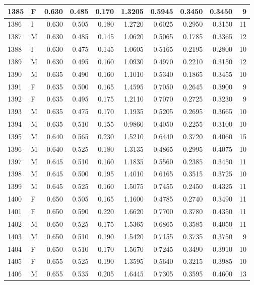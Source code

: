 \documentclass[9pt,twocolumn,twoside,]{pnas-new}
\begin{document}
\begin{tabular}{l|l|r|r|r|r|r|r|r|r}
\hline
1385 & F & 0.630 & 0.485 & 0.170 & 1.3205 & 0.5945 & 0.3450 & 0.3450 & 9\\
\hline
1386 & I & 0.630 & 0.505 & 0.180 & 1.2720 & 0.6025 & 0.2950 & 0.3150 & 11\\
\hline
1387 & M & 0.630 & 0.485 & 0.145 & 1.0620 & 0.5065 & 0.1785 & 0.3365 & 12\\
\hline
1388 & I & 0.630 & 0.475 & 0.145 & 1.0605 & 0.5165 & 0.2195 & 0.2800 & 10\\
\hline
1389 & M & 0.630 & 0.495 & 0.160 & 1.0930 & 0.4970 & 0.2210 & 0.3150 & 12\\
\hline
1390 & M & 0.635 & 0.490 & 0.160 & 1.1010 & 0.5340 & 0.1865 & 0.3455 & 10\\
\hline
1391 & F & 0.635 & 0.500 & 0.165 & 1.4595 & 0.7050 & 0.2645 & 0.3900 & 9\\
\hline
1392 & F & 0.635 & 0.495 & 0.175 & 1.2110 & 0.7070 & 0.2725 & 0.3230 & 9\\
\hline
1393 & M & 0.635 & 0.475 & 0.170 & 1.1935 & 0.5205 & 0.2695 & 0.3665 & 10\\
\hline
1394 & M & 0.635 & 0.510 & 0.155 & 0.9860 & 0.4050 & 0.2255 & 0.3100 & 10\\
\hline
1395 & M & 0.640 & 0.565 & 0.230 & 1.5210 & 0.6440 & 0.3720 & 0.4060 & 15\\
\hline
1396 & M & 0.640 & 0.525 & 0.180 & 1.3135 & 0.4865 & 0.2995 & 0.4075 & 10\\
\hline
1397 & M & 0.645 & 0.510 & 0.160 & 1.1835 & 0.5560 & 0.2385 & 0.3450 & 11\\
\hline
1398 & M & 0.645 & 0.500 & 0.195 & 1.4010 & 0.6165 & 0.3515 & 0.3725 & 10\\
\hline
1399 & M & 0.645 & 0.525 & 0.160 & 1.5075 & 0.7455 & 0.2450 & 0.4325 & 11\\
\hline
1400 & F & 0.650 & 0.505 & 0.165 & 1.1600 & 0.4785 & 0.2740 & 0.3490 & 11\\
\hline
1401 & F & 0.650 & 0.590 & 0.220 & 1.6620 & 0.7700 & 0.3780 & 0.4350 & 11\\
\hline
1402 & M & 0.650 & 0.525 & 0.175 & 1.5365 & 0.6865 & 0.3585 & 0.4050 & 11\\
\hline
1403 & M & 0.650 & 0.510 & 0.190 & 1.5420 & 0.7155 & 0.3735 & 0.3750 & 9\\
\hline
1404 & F & 0.650 & 0.510 & 0.170 & 1.5670 & 0.7245 & 0.3490 & 0.3910 & 10\\
\hline
1405 & F & 0.655 & 0.525 & 0.190 & 1.3595 & 0.5640 & 0.3215 & 0.3985 & 10\\
\hline
1406 & M & 0.655 & 0.535 & 0.205 & 1.6445 & 0.7305 & 0.3595 & 0.4600 & 13\\

\end{tabular}
\end{document}
